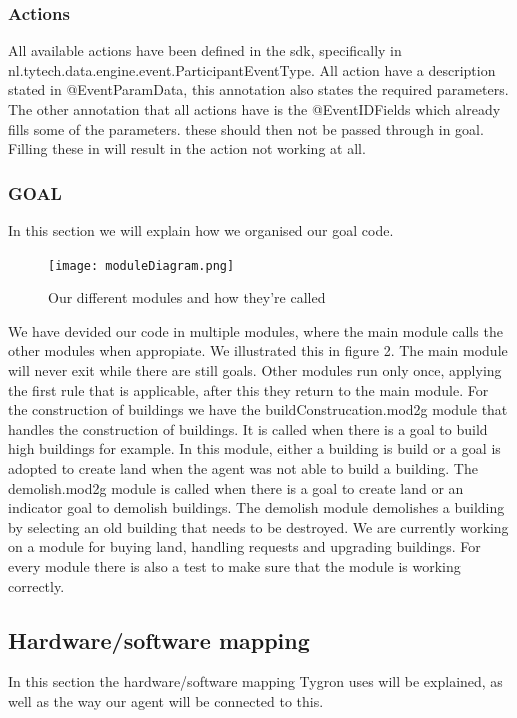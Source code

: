 \subsubsection{Actions}

All available actions have been defined in the sdk, specifically in \\nl.tytech.data.engine.event.ParticipantEventType. All action have a description stated in @EventParamData, this annotation also states the required parameters. The other annotation that all actions have is the @EventIDFields which already fills some of the parameters. these should then not be passed through in goal. Filling these in will result in the action not working at all.

\subsubsection{GOAL}

In this section we will explain how we organised our goal code.
\begin{figure}[h!]
\texttt{[image: moduleDiagram.png]}
\caption{Our different modules and how they're called}
\label{fig:Modules}
\end{figure}
We have devided our code in multiple modules, where the main module calls the other modules when appropiate. We illustrated this in figure 2.
The main module will never exit while there are still goals. Other modules run only once, applying the first rule that is applicable, after this they return to the main module.
For the construction of buildings we have the buildConstrucation.mod2g module that handles the construction of buildings. It is called when there is a goal to build high buildings for example. In this module, either a building is build or a goal is adopted to create land when the agent was not able to build a building.
The demolish.mod2g module is called when there is a goal to create land or an indicator goal to demolish buildings. The demolish module demolishes a building by selecting an old building that needs to be destroyed. We are currently working on a module for buying land, handling requests and upgrading buildings.
For every module there is also a test to make sure that the module is working correctly.

\newpage
\subsection{Hardware/software mapping}
In this section the hardware/software mapping Tygron uses will be explained, as well as the way our agent will be connected to this.

